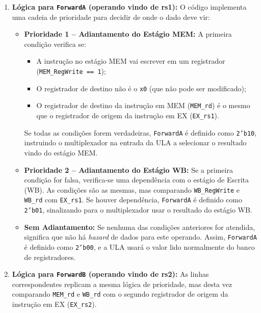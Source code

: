 \documentclass[12pt]{article}
\begin{document}
\begin{enumerate}
    \item \textbf{Lógica para \texttt{ForwardA} (operando vindo de rs1):}  
    O código implementa uma cadeia de prioridade para decidir de onde o dado deve vir:
    \begin{itemize}
        \item \textbf{Prioridade 1 -- Adiantamento do Estágio MEM:}  
        A primeira condição verifica se:
        \begin{itemize}
            \item A instrução no estágio MEM vai escrever em um registrador (\texttt{MEM\_RegWrite == 1});
            \item O registrador de destino não é o \texttt{x0} (que não pode ser modificado);
            \item O registrador de destino da instrução em MEM (\texttt{MEM\_rd}) é o mesmo que o registrador de origem da instrução em EX (\texttt{EX\_rs1}).
        \end{itemize}
        Se todas as condições forem verdadeiras, \texttt{ForwardA} é definido como \texttt{2'b10}, instruindo o multiplexador na entrada da ULA a selecionar o resultado vindo do estágio MEM.
        
        \item \textbf{Prioridade 2 -- Adiantamento do Estágio WB:}  
        Se a primeira condição for falsa, verifica-se uma dependência com o estágio de Escrita (WB).  
        As condições são as mesmas, mas comparando \texttt{WB\_RegWrite} e \texttt{WB\_rd} com \texttt{EX\_rs1}.  
        Se houver dependência, \texttt{ForwardA} é definido como \texttt{2'b01}, sinalizando para o multiplexador usar o resultado do estágio WB.
        
        \item \textbf{Sem Adiantamento:}  
        Se nenhuma das condições anteriores for atendida, significa que não há \textit{hazard} de dados para este operando. Assim, \texttt{ForwardA} é definido como \texttt{2'b00}, e a ULA usará o valor lido normalmente do banco de registradores.
    \end{itemize}
    
    \item \textbf{Lógica para \texttt{ForwardB} (operando vindo de rs2):}  
    As linhas correspondentes replicam a mesma lógica de prioridade, mas desta vez comparando \texttt{MEM\_rd} e \texttt{WB\_rd} com o segundo registrador de origem da instrução em EX (\texttt{EX\_rs2}).
\end{enumerate}
\end{document}
